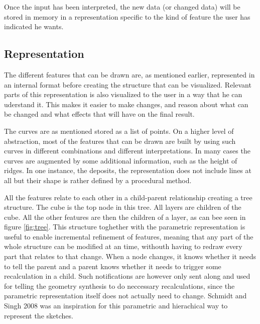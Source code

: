 \documentclass[a4paper,12pt]{report}
\begin{document}
Once the input has been interpreted, the new data (or changed data) will be stored in memory in a representation specific to the kind of feature the user has indicated he wants.

\subsection{Representation}
The different features that can be drawn are, as mentioned earlier, represented in an internal format before creating the structure that can be visualized. Relevant parts of this representation is also visualized to the user in a way that he can uderstand it. This makes it easier to make changes, and reason about what can be changed and what effects that will have on the final result.

The curves are as mentioned stored as a list of points. On a higher level of abstraction, most of the features that can be drawn are built by using such curves in different combinations and different interpretations. In many cases the curves are augmented by some additional information, such as the height of ridges. In one instance, the deposits, the representation does not include lines at all but their shape is rather defined by a procedural method.

All the features relate to each other in a child-parent relationship creating a tree structure. The cube is the top node in this tree. All layers are children of the cube. All the other features are then the children of a layer, as can bee seen in figure \ref{fig:tree}. This structure toghether with the parametric representation is useful to enable incremental refinement of features, meaning that any part of the whole structure can be modified at an time, withouth having to redraw every part that relates to that change. When a node changes, it knows whether it needs to tell the parent and a parent knows whether it needs to trigger some recalculation in a child. Such notifications are however only sent along and used for telling the geometry synthesis to do neccessary recalculations, since the parametric representation itself does not actually need to change. Schmidt and Singh 2008 \cite{CGF:CGF1129} was an inspiration for this parametric and hierachical way to represent the sketches.
\end{document}
